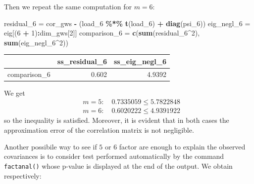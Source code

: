 \documentclass[
]{article}
\newenvironment{Shaded}{\begin{snugshade}}{\end{snugshade}}
\newcommand{\DecValTok}[1]{\textcolor[rgb]{0.00,0.00,0.81}{#1}}
\newcommand{\FunctionTok}[1]{\textcolor[rgb]{0.13,0.29,0.53}{\textbf{#1}}}
\newcommand{\NormalTok}[1]{#1}
\newcommand{\OtherTok}[1]{\textcolor[rgb]{0.56,0.35,0.01}{#1}}
\newcommand{\SpecialCharTok}[1]{\textcolor[rgb]{0.81,0.36,0.00}{\textbf{#1}}}
\theoremstyle{plain}
\begin{document}
\vspace{-12pt}

Then we repeat the same computation for \(m = 6\):

\smallskip

\begin{Shaded}
\begin{Highlighting}[]
\NormalTok{residual\_6 }\OtherTok{=}\NormalTok{ cor\_gws }\SpecialCharTok{{-}}\NormalTok{ (load\_6 }\SpecialCharTok{\%*\%} \FunctionTok{t}\NormalTok{(load\_6) }\SpecialCharTok{+} \FunctionTok{diag}\NormalTok{(psi\_6))}
\NormalTok{eig\_negl\_6 }\OtherTok{=}\NormalTok{ eig[(}\DecValTok{6} \SpecialCharTok{+} \DecValTok{1}\NormalTok{)}\SpecialCharTok{:}\NormalTok{dim\_gws[}\DecValTok{2}\NormalTok{]]}
\NormalTok{comparison\_6 }\OtherTok{=} \FunctionTok{c}\NormalTok{(}\FunctionTok{sum}\NormalTok{(residual\_6}\SpecialCharTok{\^{}}\DecValTok{2}\NormalTok{), }\FunctionTok{sum}\NormalTok{(eig\_negl\_6}\SpecialCharTok{\^{}}\DecValTok{2}\NormalTok{))}
\end{Highlighting}
\end{Shaded}

\begin{longtable}[]{@{}lrr@{}}
\toprule\noalign{}
& ss\_residual\_6 & ss\_eig\_negl\_6 \\
\midrule\noalign{}
\endhead
\bottomrule\noalign{}
\endlastfoot
comparison\_6 & 0.602 & 4.9392 \\
\end{longtable}

\vspace{-12pt}

We get \begin{align*}
    & m = 5: \quad 0.7335059 \leq 5.7822848 \\
    & m = 6: \quad 0.6020222 \leq 4.9391922
\end{align*} so the inequality is satisfied. Moreover, it is evident
that in both cases the approximation error of the correlation matrix is
not negligible.

Another possibile way to see if \(5\) or \(6\) factor are enough to
explain the observed covariances is to consider test performed
automatically by the command \texttt{factanal()} whose p-value is
displayed at the end of the output. We obtain respectively:

\smallskip

\begin{Shaded}
\end{Shaded}
\end{document}
